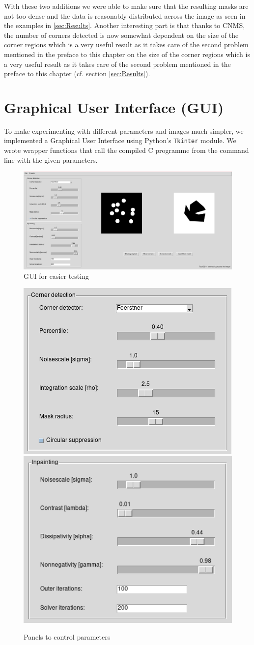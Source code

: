 With these two additions we were able to make sure that the resulting masks are not too dense and
the data is reasonably distributed across the image as seen in the examples in \ref{sec:Results}.
Another interesting part is that thanks to CNMS, the number of corners detected is now somewhat
dependent on the size of the corner regions which is a very useful result as it takes care of the
second problem mentioned in the preface to this chapter on the size of the corner regions which is
a very useful result as it takes care of the second problem mentioned in the preface to this
chapter (cf. section \ref{sec:Results}).
\section{Graphical User Interface (GUI)}
To make experimenting with different parameters and images much simpler, we implemented a Graphical
User Interface using Python's \texttt{Tkinter} module.
We wrote wrapper functions that call the compiled C programme from the command line with the given
parameters.
\begin{figure}
    \includegraphics[width=\linewidth]{../Images/gui.png}
    \caption{GUI for easier testing}
\end{figure}
\begin{figure}
    \includegraphics[width=0.5\linewidth]{../Images/parameters1.png}
    \includegraphics[width=0.5\linewidth]{../Images/parameters2.png}
    \caption{Panels to control parameters}
\end{figure}
